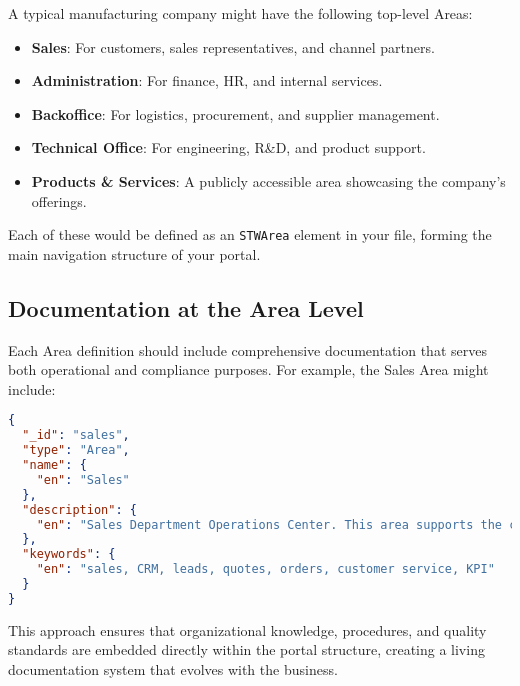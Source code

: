 A typical manufacturing company might have the following top-level Areas:
\begin{itemize}
    \item \textbf{Sales}: For customers, sales representatives, and channel partners.
    \item \textbf{Administration}: For finance, HR, and internal services.
    \item \textbf{Backoffice}: For logistics, procurement, and supplier management.
    \item \textbf{Technical Office}: For engineering, R\&D, and product support.
    \item \textbf{Products \& Services}: A publicly accessible area showcasing the company's offerings.
\end{itemize}

Each of these would be defined as an \texttt{STWArea} element in your \wbdl{} file, forming the main navigation structure of your portal.

\subsection{Documentation at the Area Level}
\label{sec:area-documentation}

Each Area definition should include comprehensive documentation that serves both operational and compliance purposes. For example, the Sales Area might include:

\begin{lstlisting}[language=JSON,caption={Sales Area with Documentation},label={lst:sales-area-docs}]
{
  "_id": "sales",
  "type": "Area",
  "name": {
    "en": "Sales"
  },
  "description": {
    "en": "Sales Department Operations Center. This area supports the complete sales lifecycle from lead generation to order fulfillment. All activities comply with our Customer Relationship Management Policy CRM-POL-001. Key Processes: Lead qualification (PROC-SALES-001), Quote generation (PROC-SALES-002), Order processing (PROC-SALES-003). Performance Targets: Response time to quotes: <24 hours, Customer satisfaction: >90%. Department Manager: Jane Smith (ext. 2001)."
  },
  "keywords": {
    "en": "sales, CRM, leads, quotes, orders, customer service, KPI"
  }
}
\end{lstlisting}

This approach ensures that organizational knowledge, procedures, and quality standards are embedded directly within the portal structure, creating a living documentation system that evolves with the business.

